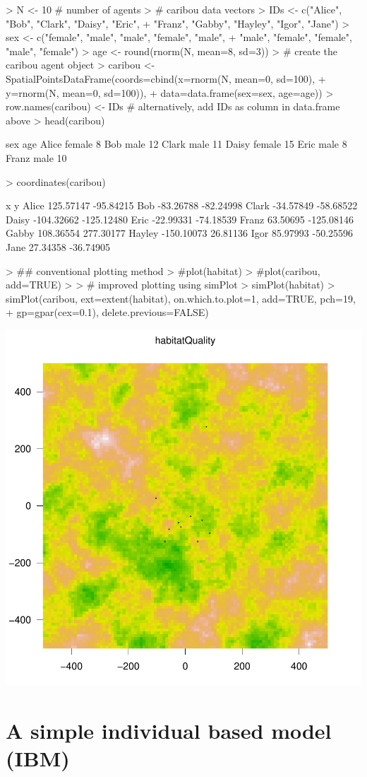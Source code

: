 \documentclass{article}
\begin{document}
\begin{Schunk}
\begin{Sinput}
> N <- 10 # number of agents
> # caribou data vectors
> IDs <- c("Alice", "Bob", "Clark", "Daisy", "Eric",
+          "Franz", "Gabby", "Hayley", "Igor", "Jane")
> sex <- c("female", "male", "male", "female", "male",
+          "male", "female", "female", "male", "female")
> age <- round(rnorm(N, mean=8, sd=3))
> # create the caribou agent object
> caribou <- SpatialPointsDataFrame(coords=cbind(x=rnorm(N, mean=0, sd=100),
+                                                y=rnorm(N, mean=0, sd=100)),
+                                   data=data.frame(sex=sex, age=age))
> row.names(caribou) <- IDs # alternatively, add IDs as column in data.frame above
> head(caribou)
\end{Sinput}
\begin{Soutput}
         sex age
Alice female   8
Bob     male  12
Clark   male  11
Daisy female  15
Eric    male   8
Franz   male  10
\end{Soutput}
\begin{Sinput}
> coordinates(caribou)
\end{Sinput}
\begin{Soutput}
                x          y
Alice   125.57147  -95.84215
Bob     -83.26788  -82.24998
Clark   -34.57849  -58.68522
Daisy  -104.32662 -125.12480
Eric    -22.99331  -74.18539
Franz    63.50695 -125.08146
Gabby   108.36554  277.30177
Hayley -150.10073   26.81136
Igor     85.97993  -50.25596
Jane     27.34358  -36.74905
\end{Soutput}
\begin{Sinput}
> ## conventional plotting method
> #plot(habitat)
> #plot(caribou, add=TRUE)
> 
> # improved plotting using simPlot
> simPlot(habitat)
> simPlot(caribou, ext=extent(habitat), on.which.to.plot=1, add=TRUE, pch=19,
+         gp=gpar(cex=0.1), delete.previous=FALSE)
\end{Sinput}
\end{Schunk}
\includegraphics{introduction-mobile-point-agent}

\newpage

\section{A simple individual based model (IBM)}

\lipsum
\end{document}
